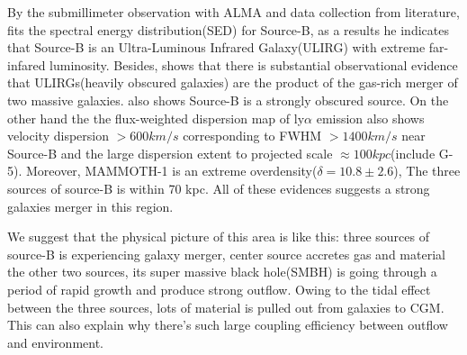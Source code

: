 \documentclass{subfiles}
\begin{document}
	By the submillimeter observation with ALMA and data collection from literature, \cite{arrigoni2018qso} fits the spectral energy distribution(SED) for Source-B, as a results he indicates that Source-B is an Ultra-Luminous Infrared Galaxy(ULIRG) with extreme far-infared luminosity. Besides, \cite{treister2010major} shows that there is substantial observational evidence that ULIRGs(heavily obscured galaxies) are the product of the gas-rich merger of two massive galaxies. \cite{cai2017discovery} also shows Source-B is a strongly obscured source. On the other hand the the flux-weighted dispersion map of ly$\alpha$ emission also shows velocity dispersion $ >600 km/s$ corresponding to FWHM $>1400 km/s$ near Source-B and the large dispersion extent to projected scale $\approx 100 kpc$(include G-5). Moreover, MAMMOTH-1 is an extreme overdensity($\delta =10.8 \pm 2.6$), The three sources of source-B is within 70 kpc. All of these evidences suggests a strong galaxies merger in this region. 
	
	We suggest that the physical picture of this area is like this: three sources of source-B is experiencing galaxy merger, center source accretes gas and material the other two sources, its super massive black hole(SMBH) is going through a period of rapid growth and produce strong outflow. Owing to the tidal effect between the three sources, lots of material is pulled out from galaxies to CGM. This can also explain why there's such large coupling efficiency between outflow and environment. 
	
\end{document}
